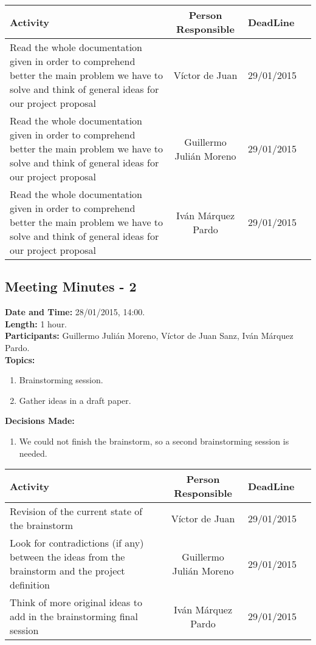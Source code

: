 \begin{tabular}{|p{5cm} | c|p{5cm}| p{2cm}|}
\hline Activity & Person Responsible & DeadLine \\\hline
Read the whole documentation given in order to comprehend better the main problem we have to solve and think of general ideas for our project proposal & Víctor de Juan & 29/01/2015\\\hline

Read the whole documentation given in order to comprehend better the main problem we have to solve and think of general ideas for our project proposal & Guillermo Julián Moreno & 29/01/2015\\\hline

Read the whole documentation given in order to comprehend better the main problem we have to solve and think of general ideas for our project proposal & Iván Márquez Pardo & 29/01/2015\\\hline
\end{tabular}



\subsection{Meeting Minutes - 2}
\textbf{Date and Time:} 28/01/2015, 14:00. \\
\textbf{Length:} 1 hour. \\
\textbf{Participants: } Guillermo Julián Moreno, Víctor de Juan Sanz, Iván Márquez Pardo.\\

\textbf{Topics: } 
\begin{enumerate}
\item Brainstorming session.
\item Gather ideas in a draft paper.
\end{enumerate}

\textbf{Decisions Made:}\\
\begin{enumerate}
\item We could not finish the brainstorm, so a second brainstorming session is needed.
\end{enumerate}

\begin{tabular}{|p{5cm} | c|p{5cm}| p{2cm}|}
\hline Activity & Person Responsible & DeadLine \\\hline
Revision of the current state of the brainstorm & Víctor de Juan & 29/01/2015\\\hline

Look for contradictions (if any) between the ideas from the brainstorm and the project definition & Guillermo Julián Moreno & 29/01/2015\\\hline

Think of more original ideas to add in the brainstorming final session & Iván Márquez Pardo & 29/01/2015\\\hline
\end{tabular}


